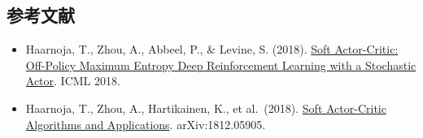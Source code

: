 \hypertarget{ux53c2ux8003ux6587ux732e-59}{%
\subsection{参考文献}\label{ux53c2ux8003ux6587ux732e-59}}

\begin{itemize}
\tightlist
\item
  Haarnoja, T., Zhou, A., Abbeel, P., \& Levine, S. (2018). \href{https://arxiv.org/abs/1801.01290}{Soft Actor-Critic: Off-Policy Maximum Entropy Deep Reinforcement Learning with a Stochastic Actor}. ICML 2018.
\item
  Haarnoja, T., Zhou, A., Hartikainen, K., et al.~(2018). \href{https://arxiv.org/abs/1812.05905}{Soft Actor-Critic Algorithms and Applications}. arXiv:1812.05905.
\end{itemize}

\clearpage
